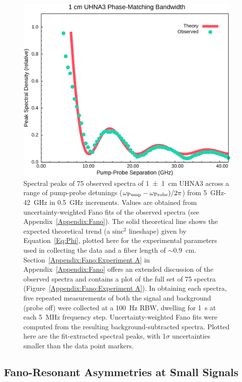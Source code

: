 \begin{figure}[t!]
  \centering
  \hspace{-2em}\includegraphics[width=.85\textwidth]{figs/3-CoBS/Phase-Match.png}
  \caption{Spectral peaks of 75 observed spectra of \SI{1(1)}{\centi\meter} \ac{UHNA3} across a range of pump-probe detunings (\(\omega_{\rm Pump} - \omega_{\rm Probe})/2\pi\)) from \SI{5}{\giga\hertz}-\SI{42}{\giga\hertz} in \SI{0.5}{\giga\hertz} increments. Values are obtained from uncertainty-weighted Fano fits of the observed spectra (see Appendix~\ref{Appendix:Fano}). The solid theoretical line shows the expected theoretical trend (a \(\mathrm{sinc^{2}}\) lineshape) given by Equation~\ref{Eq:Phi}, plotted here for the experimental parameters used in collecting the data and a fiber length of \(\sim\)\SI{0.9}{\centi\meter}. Section~\ref{Appendix:Fano:Experiment A} in Appendix~\ref{Appendix:Fano} offers an extended discussion of the observed spectra and contains a plot of the full set of 75 spectra (Figure~\ref{Appendix:Fano:Experiment A}). In obtaining each spectra, five repeated measurements of both the signal and background (probe off) were collected at a \SI{100}{\hertz} \ac{RBW}, dwelling for \SI{1}{\second} at each \SI{5}{\mega\hertz} frequency step. Uncertainty-weighted Fano fits were computed from the resulting background-subtracted spectra. Plotted here are the fit-extracted spectral peaks, with 1\(\sigma\) uncertainties smaller than the data point markers.}
  \label{fig:Phase-Match}
\end{figure}

\subsection{Fano-Resonant Asymmetries at Small Signals}
\label{Results:Fano-Resonant Asymmetries at Small Signals}

